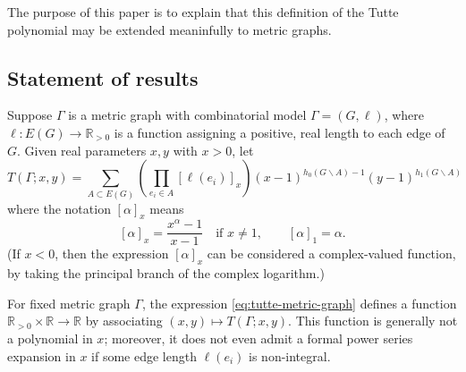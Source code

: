 \documentclass{amsart}
\theoremstyle{definition}
\newcommand{\RR}{\mathbb{R}}
\begin{document}
The purpose of this paper is to explain that this definition of the Tutte polynomial may be extended meaninfully to metric graphs.

\subsection{Statement of results}
Suppose $\Gamma$ is a metric graph with combinatorial model $\Gamma = (G,\ell)$,
where $\ell : E(G) \to \RR_{>0}$ is a function assigning a positive, real 
 length to each edge of $G$.
Given real parameters $x,y$ with $x > 0$,
let 
\begin{equation}
\label{eq:tutte-metric-graph}
T(\Gamma; x,y) = \sum_{A \subset E(G)} \left( \prod_{e_i \in A} [\ell(e_i)]_{x} \right)
(x-1)^{h_0(G\backslash A) - 1}(y-1)^{h_1(G\backslash A)}
\end{equation}
where the notation $[\alpha]_x$ means
\begin{equation*}
\label{eq:q-analog-real}
[\alpha]_x = \frac{x^\alpha - 1}{x-1}
\quad\text{if } x \neq 1,
\qquad 
[\alpha]_1 = \alpha.
\end{equation*}
(If $x < 0$, then the expression $[\alpha]_x$ can be considered a complex-valued function,
by taking the principal branch of the complex logarithm.)


For fixed metric graph $\Gamma$,
the expression \eqref{eq:tutte-metric-graph} defines a function
$\RR_{>0}\times \RR \to \RR$
by associating $(x,y) \mapsto T(\Gamma; x,y)$. 
This function is generally not a polynomial in $x$; %
moreover,  it does not even admit a formal power series expansion in $x$ 
if some edge length $\ell(e_i)$ is non-integral.
\end{document}
